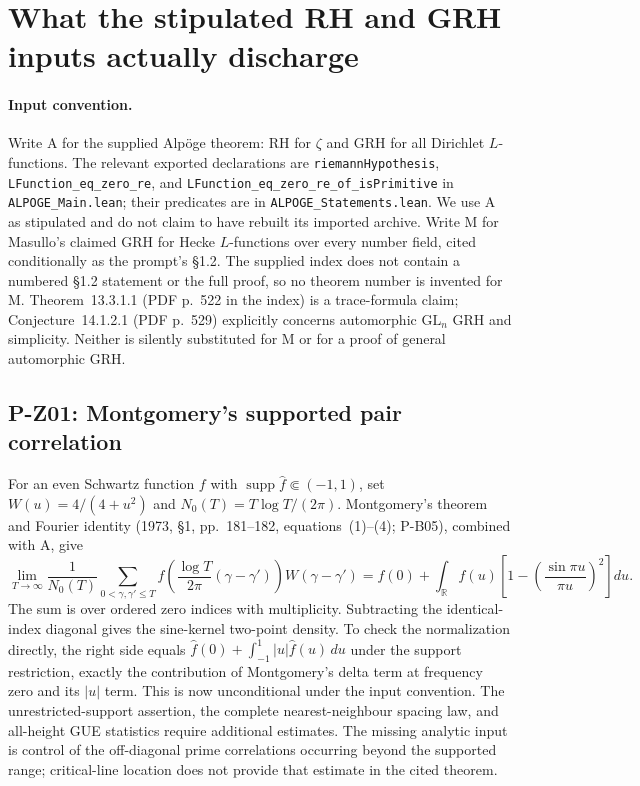 \documentclass[11pt,a4paper]{article}
\theoremstyle{definition}\newtheorem{definition}{Definition}
\begin{document}

\section{What the stipulated RH and GRH inputs actually discharge}

\paragraph{Input convention.}
Write A for the supplied Alp\"oge theorem: RH for $\zeta$ and GRH for all Dirichlet $L$-functions. The relevant exported declarations are \texttt{riemannHypothesis}, \texttt{LFunction\_eq\_zero\_re}, and \texttt{LFunction\_eq\_zero\_re\_of\_isPrimitive} in \texttt{ALPOGE\_Main.lean}; their predicates are in \texttt{ALPOGE\_Statements.lean}. We use A as stipulated and do not claim to have rebuilt its imported archive. Write M for Masullo's claimed GRH for Hecke $L$-functions over every number field, cited conditionally as the prompt's \S1.2. The supplied index does not contain a numbered \S1.2 statement or the full proof, so no theorem number is invented for M. Theorem~13.3.1.1 (PDF p.~522 in the index) is a trace-formula claim; Conjecture~14.1.2.1 (PDF p.~529) explicitly concerns automorphic $\mathrm{GL}_n$ GRH and simplicity. Neither is silently substituted for M or for a proof of general automorphic GRH.

\subsection{P-Z01: Montgomery's supported pair correlation}
For an even Schwartz function $f$ with $\operatorname{supp}\widehat f\Subset(-1,1)$, set $W(u)=4/(4+u^2)$ and $N_0(T)=T\log T/(2\pi)$. Montgomery's theorem and Fourier identity (1973, \S1, pp.~181--182, equations~(1)--(4); P-B05), combined with A, give
\[
 \lim_{T\to\infty}\frac1{N_0(T)}
 \sum_{0<\gamma,\gamma'\le T}
 f\left(\frac{\log T}{2\pi}(\gamma-\gamma')\right)W(\gamma-\gamma')
 = f(0)+\int_{\mathbb R}f(u)\left[1-\left(\frac{\sin\pi u}{\pi u}\right)^2\right]du.
\]
The sum is over ordered zero indices with multiplicity. Subtracting the identical-index diagonal gives the sine-kernel two-point density. To check the normalization directly, the right side equals
$\widehat f(0)+\int_{-1}^1|u|\widehat f(u)\,du$ under the support restriction, exactly the contribution of Montgomery's delta term at frequency zero and its $|u|$ term. This is now unconditional under the input convention. The unrestricted-support assertion, the complete nearest-neighbour spacing law, and all-height GUE statistics require additional estimates. The missing analytic input is control of the off-diagonal prime correlations occurring beyond the supported range; critical-line location does not provide that estimate in the cited theorem.
\end{document}
